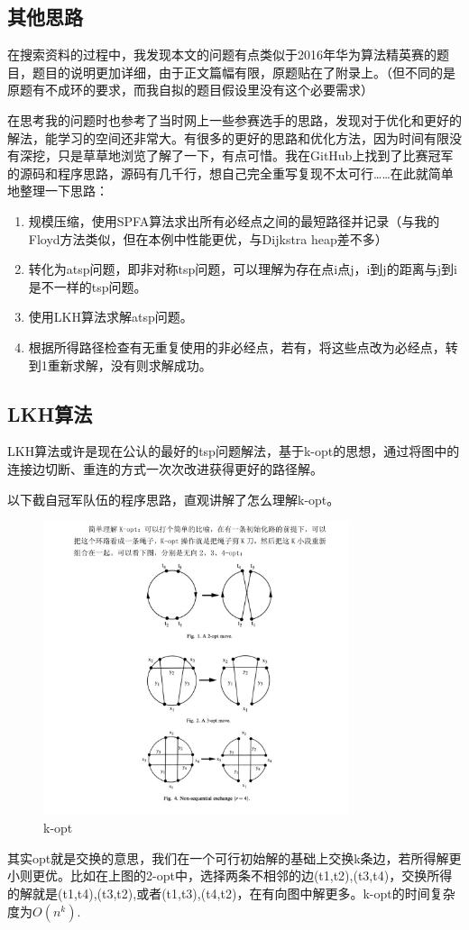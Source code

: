 \documentclass[12pt]{article}
\begin{document}
\subsection{其他思路}
在搜索资料的过程中，我发现本文的问题有点类似于2016年华为算法精英赛的题目，题目的说明更加详细，由于正文篇幅有限，原题贴在了附录上。（但不同的是原题有不成环的要求，而我自拟的题目假设里没有这个必要需求）

在思考我的问题时也参考了当时网上一些参赛选手的思路，发现对于优化和更好的解法，能学习的空间还非常大。有很多的更好的思路和优化方法，因为时间有限没有深挖，只是草草地浏览了解了一下，有点可惜。我在GitHub上找到了比赛冠军的源码和程序思路，源码有几千行，想自己完全重写复现不太可行……在此就简单地整理一下思路：
\begin{enumerate}
	\item 规模压缩，使用SPFA算法求出所有必经点之间的最短路径并记录（与我的Floyd方法类似，但在本例中性能更优，与Dijkstra heap差不多）
	\item 转化为atsp问题，即非对称tsp问题，可以理解为存在点i点j，i到j的距离与j到i是不一样的tsp问题。
	\item 使用LKH算法求解atsp问题。
	\item 根据所得路径检查有无重复使用的非必经点，若有，将这些点改为必经点，转到1重新求解，没有则求解成功。
\end{enumerate}
\subsection{LKH算法}
LKH算法或许是现在公认的最好的tsp问题解法，基于k-opt的思想，通过将图中的连接边切断、重连的方式一次次改进获得更好的路径解。

以下截自冠军队伍的程序思路，直观讲解了怎么理解k-opt。
\begin{figure}[h]
    \centering
    \includegraphics[width = 0.8\textwidth]{assets/kopt.jpg}
    \caption{\label{fig kopt.jpg}k-opt}
\end{figure}
其实opt就是交换的意思，我们在一个可行初始解的基础上交换k条边，若所得解更小则更优。比如在上图的2-opt中，选择两条不相邻的边(t1,t2),(t3,t4)，交换所得的解就是(t1,t4),(t3,t2),或者(t1,t3),(t4,t2)，在有向图中解更多。k-opt的时间复杂度为$O(n^k)$.
\end{document}

